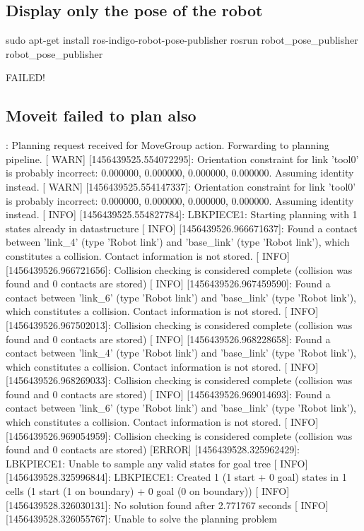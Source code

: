\subsection*{Display only the pose of the robot }

\begin{DoxyVerb}sudo apt-get install ros-indigo-robot-pose-publisher
rosrun robot_pose_publisher robot_pose_publisher
\end{DoxyVerb}


F\-A\-I\-L\-E\-D!

\subsection*{Moveit failed to plan also }

\begin{DoxyVerb}[ INFO] [1456439525.551846365]: Planning request received for MoveGroup action. Forwarding to planning pipeline.
[ WARN] [1456439525.554072295]: Orientation constraint for link 'tool0' is probably incorrect: 0.000000, 0.000000, 0.000000, 0.000000. Assuming identity instead.
[ WARN] [1456439525.554147337]: Orientation constraint for link 'tool0' is probably incorrect: 0.000000, 0.000000, 0.000000, 0.000000. Assuming identity instead.
[ INFO] [1456439525.554827784]: LBKPIECE1: Starting planning with 1 states already in datastructure
[ INFO] [1456439526.966671637]: Found a contact between 'link_4' (type 'Robot link') and 'base_link' (type 'Robot link'), which constitutes a collision. Contact information is not stored.
[ INFO] [1456439526.966721656]: Collision checking is considered complete (collision was found and 0 contacts are stored)
[ INFO] [1456439526.967459590]: Found a contact between 'link_6' (type 'Robot link') and 'base_link' (type 'Robot link'), which constitutes a collision. Contact information is not stored.
[ INFO] [1456439526.967502013]: Collision checking is considered complete (collision was found and 0 contacts are stored)
[ INFO] [1456439526.968228658]: Found a contact between 'link_4' (type 'Robot link') and 'base_link' (type 'Robot link'), which constitutes a collision. Contact information is not stored.
[ INFO] [1456439526.968269033]: Collision checking is considered complete (collision was found and 0 contacts are stored)
[ INFO] [1456439526.969014693]: Found a contact between 'link_6' (type 'Robot link') and 'base_link' (type 'Robot link'), which constitutes a collision. Contact information is not stored.
[ INFO] [1456439526.969054959]: Collision checking is considered complete (collision was found and 0 contacts are stored)
[ERROR] [1456439528.325962429]: LBKPIECE1: Unable to sample any valid states for goal tree
[ INFO] [1456439528.325996844]: LBKPIECE1: Created 1 (1 start + 0 goal) states in 1 cells (1 start (1 on boundary) + 0 goal (0 on boundary))
[ INFO] [1456439528.326030131]: No solution found after 2.771767 seconds
[ INFO] [1456439528.326055767]: Unable to solve the planning problem
\end{DoxyVerb}


